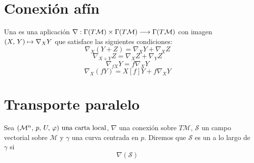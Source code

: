 \section{Conexión afín}\label{sec:conexion-affin}
\begin{definition}
  Una  es una aplicación $\nabla:\Gamma(T\mathcal{M})\times\Gamma(T\mathcal{M})\longrightarrow \Gamma(T\mathcal{M})$
  con imagen $(X,\thinspace Y)\mapsto\nabla_X Y$ que satisface las siguientes condiciones:
  \begin{equation}\label{eq:conexion-afin-condicion-1}
    \nabla_X (Y+Z) = \nabla_X Y + \nabla_X Z
  \end{equation}
  \begin{equation}\label{eq:conexion-afin-condicion-2}
    \nabla_{X+Y} Z = \nabla_X Z + \nabla_Y Z
  \end{equation}
  \begin{equation}\label{eq:conexion-afin-condicion-3}
    \nabla_{fX} Y = f\nabla_X Y
  \end{equation}
  \begin{equation}\label{eq:conexion-afin-condicion-4}
    \nabla_X (fY) = X[f] Y + f\nabla_X Y
  \end{equation}
\end{definition}


\section{Transporte paralelo}\label{sec:transporte-paralelo}
\begin{definition}
  Sea $(\mathcal{M}^n,\thinspace p,\thinspace U,\thinspace \varphi)\textmd{ una carta local}$, $\nabla$ una conexión sobre $T\mathcal{M}$, $\mathcal{S}$ un campo vectorial sobre
  $\mathcal{\mathcal{M}}$ y $\gamma$ una curva centrada en $p$. Diremos que $\mathcal{S}$ es un  a lo
  largo de $\gamma$ si
  \begin{equation}
    \nabla(\mathcal{S})
  \end{equation}
\end{definition}